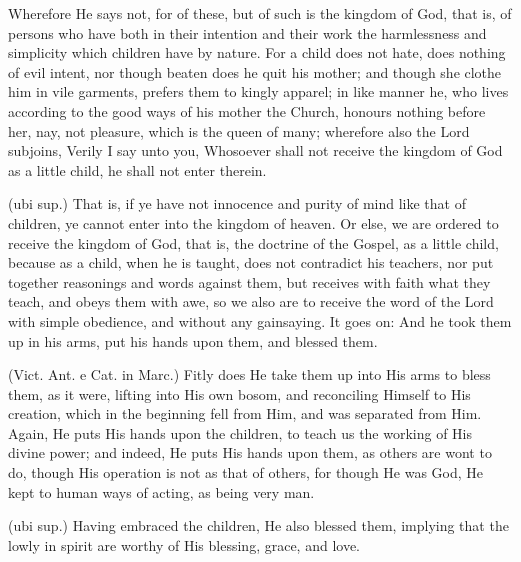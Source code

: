  Wherefore He says not, for of these, but of such is the kingdom of God, that is, of persons who have both in their intention and their work the harmlessness and simplicity which children have by nature. For a child does not hate, does nothing of evil intent, nor though beaten does he quit his mother; and though she clothe him in vile garments, prefers them to kingly apparel; in like manner he, who lives according to the good ways of his mother the Church, honours nothing before her, nay, not pleasure, which is the queen of many; wherefore also the Lord subjoins, Verily I say unto you, Whosoever shall not receive the kingdom of God as a little child, he shall not enter therein.

 (ubi sup.) That is, if ye have not innocence and purity of mind like that of children, ye cannot enter into the kingdom of heaven. Or else, we are ordered to receive the kingdom of God, that is, the doctrine of the Gospel, as a little child, because as a child, when he is taught, does not contradict his teachers, nor put together reasonings and words against them, but receives with faith what they teach, and obeys them with awe, so we also are to receive the word of the Lord with simple obedience, and without any gainsaying. It goes on: And he took them up in his arms, put his hands upon them, and blessed them.

 (Vict. Ant. e Cat. in Marc.) Fitly does He take them up into His arms to bless them, as it were, lifting into His own bosom, and reconciling Himself to His creation, which in the beginning fell from Him, and was separated from Him. Again, He puts His hands upon the children, to teach us the working of His divine power; and indeed, He puts His hands upon them, as others are wont to do, though His operation is not as that of others, for though He was God, He kept to human ways of acting, as being very man.

 (ubi sup.) Having embraced the children, He also blessed them, implying that the lowly in spirit are worthy of His blessing, grace, and love.

